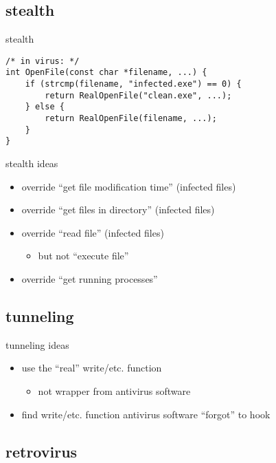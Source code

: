 \subsection{stealth}

\begin{frame}[fragile,label=stealth]{stealth}
\lstset{language=C,style=small}
\begin{lstlisting}
/* in virus: */
int OpenFile(const char *filename, ...) {
    if (strcmp(filename, "infected.exe") == 0) {
        return RealOpenFile("clean.exe", ...);
    } else {
        return RealOpenFile(filename, ...);
    }
}
\end{lstlisting}
\end{frame}

\begin{frame}{stealth ideas}
    \begin{itemize}
    \item override ``get file modification time'' (infected files)
    \item override ``get files in directory'' (infected files)
    \item override ``read file'' (infected files)
        \begin{itemize}
        \item but not ``execute file''
        \end{itemize}
    \item override ``get running processes'' 
    \end{itemize}
\end{frame}

\subsection{tunneling}

\begin{frame}{tunneling ideas}
    \begin{itemize}
    \item use the ``real'' write/etc. function
        \begin{itemize}
        \item not wrapper from antivirus software
        \end{itemize}
    \item find write/etc. function antivirus software ``forgot'' to hook
    \end{itemize}
\end{frame}

\subsection{retrovirus}

